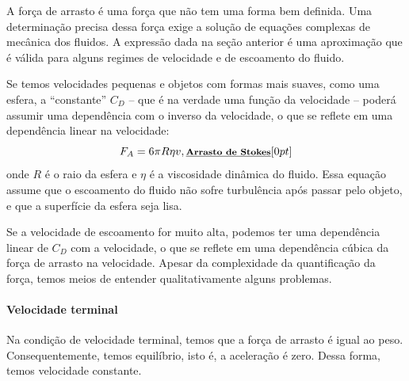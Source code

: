 A força de arrasto é uma força que não tem uma forma bem definida. Uma determinação precisa dessa força exige a solução de equações complexas de mecânica dos fluidos. A expressão dada na seção anterior é uma aproximação que é válida para alguns regimes de velocidade e de escoamento do fluido.

Se temos velocidades pequenas e objetos com formas mais suaves,  como uma esfera, a ``constante'' $C_D$ -- que é na verdade uma função da velocidade -- poderá assumir uma dependência com o inverso da velocidade, o que se reflete em uma dependência linear na velocidade:
\begin{equation}
  F_A = 6 \pi R \eta v, \relax{\footnotesize\emph{\textbf{Arrasto de Stokes}}}[0pt]
\end{equation}
%
onde $R$ é o raio da esfera e $\eta$ é a viscosidade dinâmica do fluido. Essa equação assume que o escoamento do fluido não sofre turbulência após passar pelo objeto, e que a superfície da esfera seja lisa.

Se a velocidade de escoamento for muito alta, podemos ter uma dependência linear de $C_D$ com a velocidade, o que se reflete em uma dependência cúbica da força de arrasto na velocidade. Apesar da complexidade da quantificação da força, temos meios de entender qualitativamente alguns problemas.

\paragraph{Velocidade terminal}
\begin{marginfigure}[-3cm]
\centering
{}
\caption{Na condição de velocidade terminal, temos que a força de arrasto é igual ao peso. Consequentemente, temos equilíbrio, isto é, a aceleração é zero. Dessa forma, temos velocidade constante.}
\end{marginfigure}

